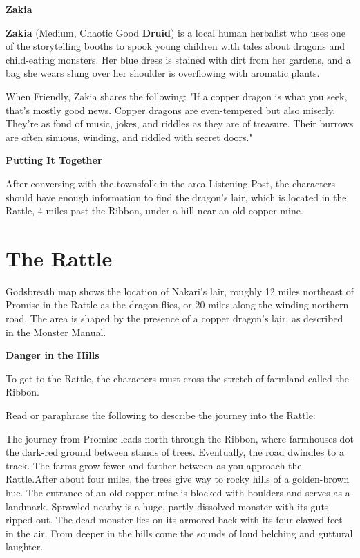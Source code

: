 \documentclass[letterpaper, 11pt, twocolumn]{dndbook}
\begin{document}
\textbf{Zakia}

\textbf{Zakia} (Medium, Chaotic Good \textbf{Druid}) is a local human herbalist who uses one of the storytelling booths to spook young children with tales about dragons and child-eating monsters. Her blue dress is stained with dirt from her gardens, and a bag she wears slung over her shoulder is overflowing with aromatic plants.

When Friendly, Zakia shares the following: "If a copper dragon is what you seek, that's mostly good news. Copper dragons are even-tempered but also miserly. They're as fond of music, jokes, and riddles as they are of treasure. Their burrows are often sinuous, winding, and riddled with secret doors."


\textbf{Putting It Together}

After conversing with the townsfolk in the area Listening Post, the characters should have enough information to find the dragon's lair, which is located in the Rattle, 4 miles past the Ribbon, under a hill near an old copper mine.
\section{The Rattle}



Godsbreath map shows the location of Nakari's lair, roughly 12 miles northeast of Promise in the Rattle as the dragon flies, or 20 miles along the winding northern road. The area is shaped by the presence of a copper dragon's lair, as described in the Monster Manual.

\textbf{Danger in the Hills}


To get to the Rattle, the characters must cross the stretch of farmland called the Ribbon.

Read or paraphrase the following to describe the journey into the Rattle:

\begin{DndReadAloud}
The journey from Promise leads north through the Ribbon, where farmhouses dot the dark-red ground between stands of trees. Eventually, the road dwindles to a track. The farms grow fewer and farther between as you approach the Rattle.After about four miles, the trees give way to rocky hills of a golden-brown hue. The entrance of an old copper mine is blocked with boulders and serves as a landmark. Sprawled nearby is a huge, partly dissolved monster with its guts ripped out. The dead monster lies on its armored back with its four clawed feet in the air. From deeper in the hills come the sounds of loud belching and guttural laughter.
\end{DndReadAloud}
\end{document}
